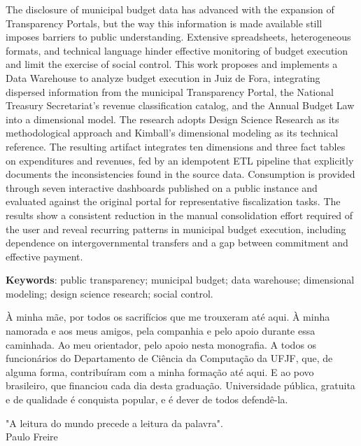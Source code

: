 \documentclass[a4paper,12pt]{monografia}
\theoremstyle{plain}
\theoremstyle{definition}
\theoremstyle{remark}
\begin{document}
The disclosure of municipal budget data has advanced with the expansion of Transparency Portals, but the way this information is made available still imposes barriers to public understanding. Extensive spreadsheets, heterogeneous formats, and technical language hinder effective monitoring of budget execution and limit the exercise of social control. This work proposes and implements a Data Warehouse to analyze budget execution in Juiz de Fora, integrating dispersed information from the municipal Transparency Portal, the National Treasury Secretariat's revenue classification catalog, and the Annual Budget Law into a dimensional model. The research adopts Design Science Research as its methodological approach and Kimball's dimensional modeling as its technical reference. The resulting artifact integrates ten dimensions and three fact tables on expenditures and revenues, fed by an idempotent ETL pipeline that explicitly documents the inconsistencies found in the source data. Consumption is provided through seven interactive dashboards published on a public instance and evaluated against the original portal for representative fiscalization tasks. The results show a consistent reduction in the manual consolidation effort required of the user and reveal recurring patterns in municipal budget execution, including dependence on intergovernmental transfers and a gap between commitment and effective payment.

\vspace{0.3cm}
\noindent\textbf{Keywords}: public transparency; municipal budget; data warehouse; dimensional modeling; design science research; social control.

 \indent\indent 
À minha mãe, por todos os sacrifícios que me trouxeram até aqui. À minha namorada e aos meus amigos, pela companhia e pelo apoio durante essa caminhada. Ao meu orientador, pelo apoio nesta monografia. A todos os funcionários do Departamento de Ciência da Computação da UFJF, que, de alguma forma, contribuíram com a minha formação até aqui. E ao povo brasileiro, que financiou cada dia desta graduação. Universidade pública, gratuita e de qualidade é conquista popular, e é dever de todos defendê-la.

\newpage

\begin{epigrafe}
"A leitura do mundo precede a leitura da palavra".\\
\hfill Paulo Freire
\end{epigrafe}
\end{document}
